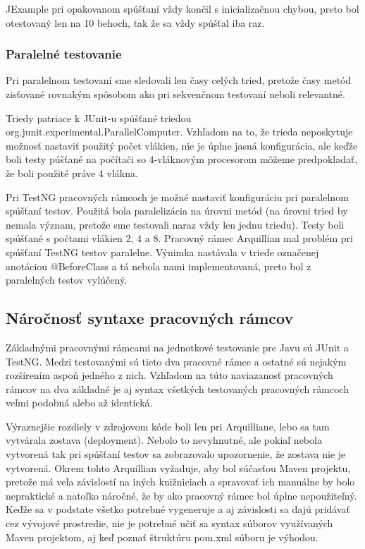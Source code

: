 \documentclass[11pt,twoside,slovak,a4paper]{article}
\begin{document}
	JExample pri opakovanom spúšťaní vždy končil s inicializačnou chybou, preto bol otestovaný len na 10 behoch, tak že sa vždy spúšťal iba raz.
	
	\subsubsection{Paralelné testovanie}
	Pri paralelnom testovaní sme sledovali len časy celých tried, pretože časy metód zisťované rovnakým spôsobom ako pri sekvenčnom testovaní neboli relevantné.
	
	Triedy patriace k JUnit-u spúšťané triedou org.junit.experimental.ParallelComputer. Vzhľadom na to, že trieda neposkytuje možnosť nastaviť použitý počet vlákien, nie je úplne jasná konfigurácia, ale keďže boli testy púšťané na počítači so 4-vláknovým procesorom môžeme predpokladať, že boli použité práve 4 vlákna.
	
	Pri TestNG pracovných rámcoch je možné nastaviť konfiguráciu pri paralelnom spúšťaní testov. Použitá bola paralelizácia na úrovni metód (na úrovni tried by nemala význam, pretože sme testovali naraz vždy len jednu triedu). Testy boli spúšťané s počtami vlákien 2, 4 a 8. Pracovný rámec Arquillian mal problém pri spúšťaní TestNG testov paralelne. Výnimka nastávala v triede označenej anotáciou @BeforeClass a tá nebola nami implementovaná, preto bol z paralelných testov vylúčený.
	
	\subsection{Náročnosť syntaxe pracovných rámcov}
	Základnými pracovnými rámcami na jednotkové testovanie pre Javu sú JUnit a TestNG. Medzi testovanými sú tieto dva pracovné rámce a ostatné sú nejakým rozšírením aspoň jedného z nich. Vzhľadom na túto naviazanosť pracovných rámcov na dva základné je aj syntax všetkých testovaných pracovných rámcoch veľmi podobná alebo až identická.
	
	Výraznejšie rozdiely v zdrojovom kóde boli len pri Arquilliane, lebo sa tam vytvárala zostava (deployment). Nebolo to nevyhnutné, ale pokiaľ nebola vytvorená tak pri spúšťaní testov sa zobrazovalo upozornenie, že zostava nie je vytvorená. Okrem tohto Arquillian vyžaduje, aby bol súčasťou Maven projektu, pretože má veľa závislostí na iných knižniciach a spravovať ich manuálne by bolo nepraktické a natoľko náročné, že by ako pracovný rámec bol úplne nepoužiteľný. Keďže sa v podstate všetko potrebné vygeneruje a aj závislosti sa dajú pridávať cez vývojové prostredie, nie je potrebné učiť sa syntax súborov využívaných Maven projektom, aj keď poznať štruktúru pom.xml súboru je výhodou.
	
\end{document}
